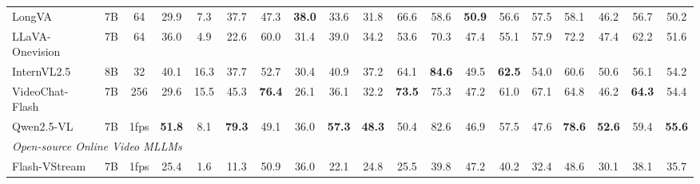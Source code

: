 \begin{table}[t]
{\begin{tabular}{lcccccccccccccccccc}
LongVA \cite{zhang2024longva} & 7B & \multicolumn{1}{c|}{64} & 29.9 & 7.3 & 37.7 & 47.3 & \textbf{38.0} & \multicolumn{1}{c|}{33.6} & \multicolumn{1}{c|}{31.8} & 66.6 & 58.6 & \multicolumn{1}{c|}{\textbf{50.9}} & \multicolumn{1}{c|}{56.6} & 57.5 & 58.1 & \multicolumn{1}{c|}{46.2} & \multicolumn{1}{c|}{56.7} & 50.2 \\

LLaVA-Onevision \cite{li2024llavaov} & 7B & \multicolumn{1}{c|}{64} & 36.0 & 4.9 & 22.6 & 60.0 & 31.4 & \multicolumn{1}{c|}{39.0} & \multicolumn{1}{c|}{34.2} & 53.6 & 70.3 & \multicolumn{1}{c|}{47.4} & \multicolumn{1}{c|}{55.1} & 57.9 & 72.2 & \multicolumn{1}{c|}{47.4} & \multicolumn{1}{c|}{62.2} & 51.6 \\

InternVL2.5 \cite{chen2024internvl2_5} & 8B & \multicolumn{1}{c|}{32} & 40.1 & 16.3 & 37.7 & 52.7 & 30.4 & \multicolumn{1}{c|}{40.9} & \multicolumn{1}{c|}{37.2} & 64.1 & \textbf{84.6} & \multicolumn{1}{c|}{49.5} & \multicolumn{1}{c|}{\textbf{62.5}} & 54.0 & 60.6 & \multicolumn{1}{c|}{50.6} & \multicolumn{1}{c|}{56.1} & 54.2 \\

VideoChat-Flash \cite{li2024videochatflash} & 7B & \multicolumn{1}{c|}{256} & 29.6 & 15.5 & 45.3 & \textbf{76.4} & 26.1 & \multicolumn{1}{c|}{36.1} & \multicolumn{1}{c|}{32.2} & \textbf{73.5} & 75.3 & \multicolumn{1}{c|}{47.2} & \multicolumn{1}{c|}{61.0} & 67.1 & 64.8 & \multicolumn{1}{c|}{46.2} & \multicolumn{1}{c|}{\textbf{64.3}} & 54.4 \\

Qwen2.5-VL \cite{bai2025qwen2_5vl} & 7B & \multicolumn{1}{c|}{1fps} & \textbf{51.8} & 8.1 & \textbf{79.3} & 49.1 & 36.0 & \multicolumn{1}{c|}{\textbf{57.3}} & \multicolumn{1}{c|}{\textbf{48.3}} & 50.4 & 82.6 & \multicolumn{1}{c|}{46.9} & \multicolumn{1}{c|}{57.5} & 47.6 & \textbf{78.6} & \multicolumn{1}{c|}{\textbf{52.6}} & \multicolumn{1}{c|}{59.4} & \textbf{55.6} \\ 


\hline
\multicolumn{19}{l}{\textit{Open-source Online Video MLLMs}}\\ 
\hline


Flash-VStream \cite{zhang2024flashvstream} & 7B & \multicolumn{1}{c|}{1fps} & 25.4 & 1.6 & 11.3 & 50.9 & 36.0 & \multicolumn{1}{c|}{22.1} & \multicolumn{1}{c|}{24.8} & 25.5 & 39.8 & \multicolumn{1}{c|}{47.2} & \multicolumn{1}{c|}{40.2} & 32.4 & 48.6 & \multicolumn{1}{c|}{30.1} & \multicolumn{1}{c|}{38.1} & 35.7 \\


\end{tabular}}
\end{table}
